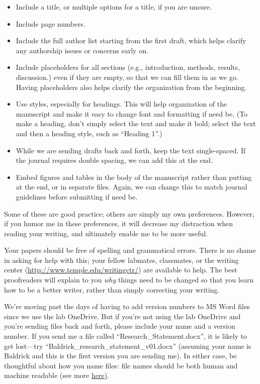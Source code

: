 \documentclass[letterpaper,11pt,oneside]{memoir}
\begin{document}
\begin{itemize}[noitemsep]
\item Include a title, or multiple options for a title, if you are unsure. 
\item Include page numbers.
\item Include the full author list starting from the first draft, which helps clarify any authorship issues or concerns early on.
\item Include placeholders for all sections (e.g., introduction, methods, results, discussion.) even if they are empty, so that we can fill them in as we go. Having placeholders also helps clarify the organization from the beginning.
\item Use styles, especially for headings. This will help organization of the manuscript and make it easy to change font and formatting if need be. (To make a heading, don't simply select the text and make it bold; select the text and then a heading style, such as ``Heading 1''.)
\item While we are sending drafts back and forth, keep the text single-spaced. If the journal requires double spacing, we can add this at the end.
\item Embed figures and tables in the body of the manuscript rather than putting at the end, or in separate files. Again, we can change this to match journal guidelines before submitting if need be.
\end{itemize}

Some of these are good practice; others are simply my own preferences. However, if you humor me in these preferences, it will decrease my distraction when reading your writing, and ultimately enable me to be more useful.

Your papers should be free of spelling and grammatical errors. There is no shame in asking for help with this; your fellow labmates, classmates, or the writing center (\url{http://www.temple.edu/writingctr/}) are available to help. The best proofreaders will explain to you \textit{why} things need to be changed so that you learn how to be a better writer, rather than simply correcting your writing. 


\begin{shaded}
\noindent We're moving past the days of having to add version numbers to MS Word files since we use the lab OneDrive. But if you're not using the lab OneDrive and you're sending files back and forth, please include your name and a version number. If you send me a file called ``Research\_Statement.docx'', it is likely to get lost---try ``Baldrick\_research\_statement\_v01.docx'' (assuming your name is Baldrick and this is the first version you are sending me). In either case, be thoughtful about how you name files: file names should be both human and machine readable (see more \href{http://www2.stat.duke.edu/~rcs46/lectures_2015/01-markdown-git/slides/naming-slides/naming-slides.pdf}{here)}.
\end{shaded}
\end{document}

